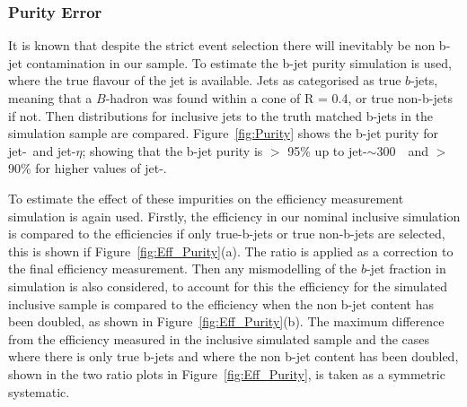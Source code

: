 \subsubsection{Purity Error}
\label{sec:trig-purity}

It is known that despite the strict event selection there will inevitably be non b-jet contamination in our sample.
To estimate the b-jet purity simulation is used, where the true flavour of the jet is available.
Jets as categorised as true $b$-jets, meaning that a $B$-hadron was found within a cone of R = 0.4, or true non-b-jets if not.
Then distributions for inclusive jets to the truth matched b-jets in the simulation sample are compared.
Figure~\ref{fig:Purity} shows the b-jet purity for jet-\pT~and jet-$\eta$;
showing that the b-jet purity is $>$ 95\% up to jet-\pT$\sim$300~\GeV~and $>$ 90\% for higher values of jet-\pT.

To estimate the effect of these impurities on the efficiency measurement simulation is again used.
Firstly, the efficiency in our nominal inclusive simulation is compared
to the efficiencies if only true-b-jets or true non-b-jets are selected,
this is shown if Figure~\ref{fig:Eff_Purity}(a).
The ratio is applied as a correction to the final efficiency measurement.
Then any mismodelling of the  $b$-jet fraction in simulation is also considered,
to account for this the efficiency for the simulated inclusive sample is compared to the efficiency when the non b-jet content has been doubled, as shown in Figure~\ref{fig:Eff_Purity}(b).
The maximum difference from the efficiency measured in the inclusive simulated sample and the cases
where there is only true b-jets and where the non b-jet content has been doubled,
shown in the two ratio plots in Figure~\ref{fig:Eff_Purity}, is taken as a symmetric systematic.

